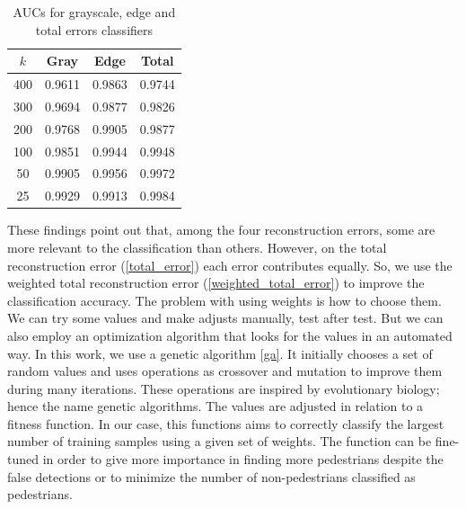 \documentclass[10pt, conference, compsocconf]{IEEEtran}
\begin{document}
\begin{table}[t]
  \caption{AUCs for grayscale, edge and total errors classifiers}
  \begin{center}
    \begin{tabular}{  c | c  c  c  }
      \hline
      $k$ & Gray & Edge & Total \\
      \hline
      400 & 0.9611 & 0.9863 & 0.9744 \\
      300 & 0.9694 & 0.9877 & 0.9826 \\ 
      200 & 0.9768 & 0.9905 & 0.9877 \\
      100 & 0.9851 & 0.9944 & 0.9948 \\
      50  & 0.9905 & 0.9956 & 0.9972 \\
      25  & 0.9929 & 0.9913 & 0.9984 \\
      \hline  
    \end{tabular}
  \end{center}
  \label{table_gray_vs_edge}
\end{table}

These findings point out that, among the four reconstruction errors, some are more relevant to the classification than others. However, on the total reconstruction error (\ref{total_error}) each error contributes equally. So, we use the weighted total reconstruction error (\ref{weighted_total_error}) to improve the classification accuracy. The problem with using weights is how to choose them. We can try some values and make adjusts manually, test after test. But we can also employ an optimization algorithm that looks for the values in an automated way. In this work, we use a genetic algorithm \ref{ga}. It initially chooses a set of random values and uses operations as crossover and mutation to improve them during many iterations. These operations are inspired by evolutionary biology; hence the name genetic algorithms. The values are adjusted in relation to a fitness function. In our case, this functions aims to correctly classify the largest number of training samples using a given set of weights. The function can be fine-tuned in order to give more importance in finding more pedestrians despite the false detections or to minimize the number of non-pedestrians classified as pedestrians.
\end{document}
